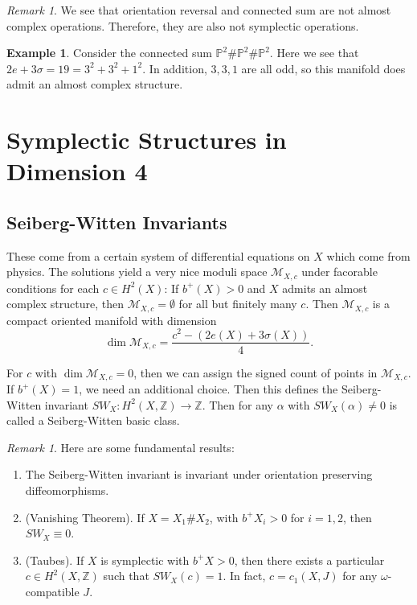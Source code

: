\documentclass[leqno, openany]{memoir}
\theoremstyle{definition}
\newtheorem{exm}[thm]{Example}
\theoremstyle{remark}
\newtheorem{rmk}[thm]{Remark}
\theoremstyle{plain}
\theoremstyle{definition}
\theoremstyle{remark}
\newcommand{\Z}{\mathbb{Z}}
\renewcommand{\P}{\mathbb{P}}
\newcommand{\mc}[1]{\mathcal{#1}}
\begin{document}
\begin{rmk}
    We see that orientation reversal and connected sum are not almost complex operations. Therefore, they are also not symplectic operations.
\end{rmk}

\begin{exm}
    Consider the connected sum $\P^2 \# \P^2 \# \P^2$. Here we see that $2e + 3 \sigma = 19 = 3^2 + 3^2 + 1^2$. In addition, $3,3,1$ are all odd, so this manifold does admit an almost complex structure.
\end{exm}

\section{Symplectic Structures in Dimension 4}%
\label{sec:symplectic_structures_in_dimension_4}

\subsection{Seiberg-Witten Invariants}%
\label{sub:seiberg_witten_invariants}

These come from a certain system of differential equations on $X$ which come from physics. The solutions yield a very nice moduli space $\mc{M}_{X,c}$ under facorable conditions for each $c \in H^2(X)$: If $b^+(X) > 0$ and $X$ admits an almost complex structure, then $\mc{M}_{X,c} = \emptyset$ for all but finitely many $c$. Then $\mc{M}_{X,c}$ is a compact oriented manifold with dimension
\[ \dim \mc{M}_{X,c} = \frac{c^2 - (2e(X) + 3\sigma(X))}{4}. \]

For $c$ with $\dim \mc{M}_{X,c} = 0$, then we can assign the signed count of points in $\mc{M}_{X,c}$. If $b^+(X) = 1$, we need an additional choice. Then this defines the Seiberg-Witten invariant $SW_X: H^2(X, \Z) \to \Z$. Then for any $\alpha$ with $SW_X(\alpha) \neq 0$ is called a Seiberg-Witten basic class.

\begin{rmk}
    Here are some fundamental results:
    \begin{enumerate}
        \item The Seiberg-Witten invariant is invariant under orientation preserving diffeomorphisms.
        \item (Vanishing Theorem). If $X = X_1 \# X_2$, with $b^+ X_i > 0$ for $i = 1,2$, then $SW_X \equiv 0$.
        \item (Taubes). If $X$ is symplectic with $b^+ X > 0$, then there exists a particular $c \in H^2(X, \Z)$ such that $SW_X(c) = 1$. In fact, $c = c_1(X, J)$ for any $\omega$-compatible $J$.
    \end{enumerate}
\end{rmk}
\end{document}

